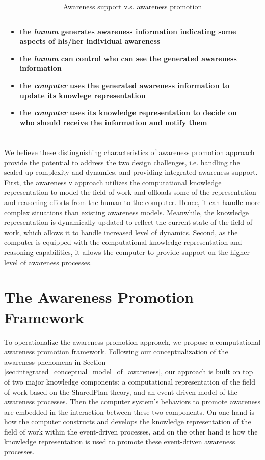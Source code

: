 {\begin{longtable}{>{\raggedright}p{1.1in}>{\raggedright}p{2.2in}>{\raggedright}p{2.2in}}
\begin{itemize}[nosep]
\item the \emph{human} generates awareness information indicating some aspects
of his/her individual awareness
\item the \emph{human} can control who can see the generated awareness information
\item the \emph{computer} uses the generated awareness information to update
its knowlege representation
\item the \emph{computer} uses its knowledge representation to decide on
who should receive the information and notify them\end{itemize}
\tabularnewline
\bottomrule
\caption{Awareness support v.s. awareness promotion}
\label{tab:awareness_support_vs_promotion}
\end{longtable}
}

We believe these distinguishing characteristics of awareness promotion approach provide the potential to address the two design challenges, i.e. handling the scaled up complexity and dynamics, and providing integrated awareness support. First, the awareness v approach utilizes the computational knowledge representation to model the field of work and offloads some of the representation and reasoning efforts from the human to the computer. Hence, it can  handle more complex situations than existing awareness models. Meanwhile, the knowledge representation is dynamically updated to reflect the current state of the field of work, which allows it to handle increased level of dynamics. Second, as the computer is equipped with the computational knowledge representation and reasoning capabilities, it allows the computer to provide support on the higher level of awareness processes.

\section{The Awareness Promotion Framework} %
\label{sec:awareness_promotion_framework}
To operationalize the awareness promotion approach, we propose a computational awareness promotion framework. Following our conceptualization of the awareness phenomena in Section \ref{sec:integrated_conceptual_model_of_awareness}, our approach is built on top of two major knowledge components: a computational representation of the field of work based on the SharedPlan theory, and an event-driven model of the awareness processes. Then the computer system's behaviors to promote awareness are embedded in the interaction between these two components. On one hand is how the computer constructs and develops the knowledge representation of the field of work within the event-driven processes, and on the other hand is how the knowledge representation is used to promote these event-driven awareness processes.

